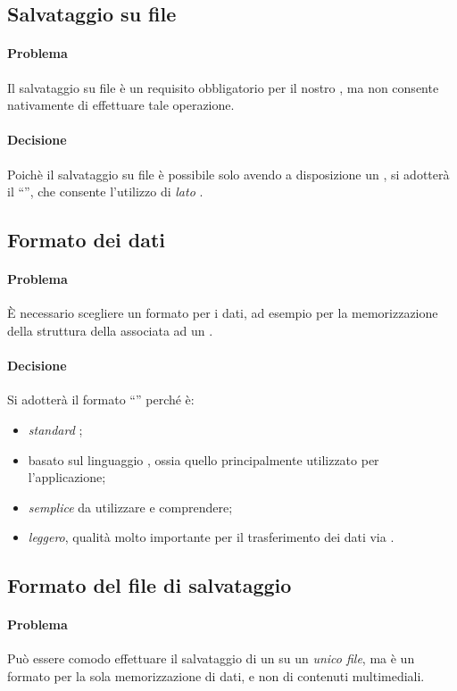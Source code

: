 \subsection{Salvataggio su file}
\paragraph{Problema} Il salvataggio su file è un requisito obbligatorio per il nostro , ma  non consente nativamente di effettuare tale operazione.
\paragraph{Decisione} Poichè il salvataggio su file è possibile solo avendo a disposizione un \emph{}, si adotterà il  ``'', che consente l'utilizzo di \emph{ lato }.
\subsection{Formato dei dati}
\paragraph{Problema} È necessario scegliere un formato per i dati, ad esempio per la memorizzazione della struttura della  associata ad un .
\paragraph{Decisione} Si adotterà il formato ``'' perché è:
\begin{itemize}
\item \emph{standard} ;
\item basato sul linguaggio , ossia quello principalmente utilizzato per l’applicazione;
\item \emph{semplice} da utilizzare e comprendere;
\item \emph{leggero}, qualità molto importante per il trasferimento dei dati via .
\end{itemize}
\subsection{Formato del file di salvataggio}
\paragraph{Problema} Può essere comodo effettuare il salvataggio di un  su un \emph{unico file}, ma  è un formato per la sola memorizzazione di dati, e non di contenuti multimediali.
